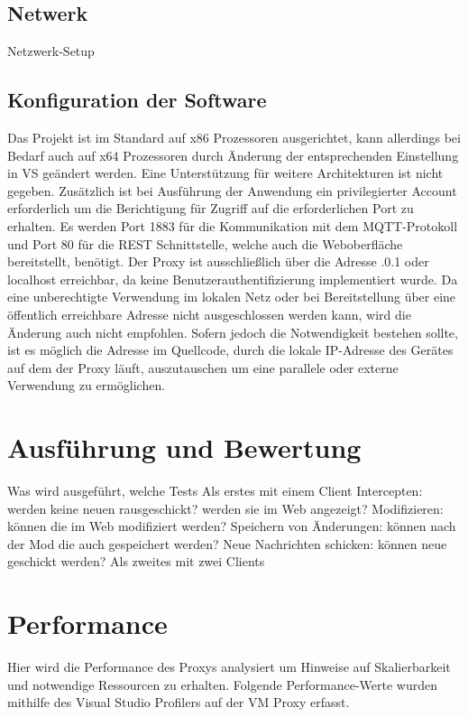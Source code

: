     \subsection{Netwerk}
    Netzwerk-Setup
    
    \subsection{Konfiguration der Software}
    Das Projekt ist im Standard auf x86 Prozessoren ausgerichtet, kann allerdings bei Bedarf auch auf x64 Prozessoren durch Änderung der entsprechenden Einstellung in \ac{VS} geändert werden.
    Eine Unterstützung für weitere Architekturen ist nicht gegeben.
    Zusätzlich ist bei Ausführung der Anwendung ein privilegierter Account erforderlich um die Berichtigung für Zugriff auf die erforderlichen Port zu erhalten.
    Es werden Port 1883 für die Kommunikation mit dem \ac{MQTT}-Protokoll und Port 80 für die \ac{REST} Schnittstelle, welche auch die Weboberfläche bereitstellt, benötigt.
    Der Proxy ist ausschließlich über die Adresse .0.1\grqq{} oder \glqq localhost\grqq{} erreichbar, da keine Benutzerauthentifizierung implementiert wurde. Da eine unberechtigte Verwendung im lokalen Netz oder bei Bereitstellung über eine öffentlich erreichbare Adresse nicht ausgeschlossen werden kann, wird die Änderung auch nicht empfohlen. Sofern jedoch die Notwendigkeit bestehen sollte, ist es möglich die Adresse im Quellcode, durch die lokale IP-Adresse des Gerätes auf dem der Proxy läuft, auszutauschen um eine parallele oder externe Verwendung zu ermöglichen.
    
    
\section{Ausführung und Bewertung}
Was wird ausgeführt, welche Tests
Als erstes mit einem Client
    Intercepten: werden keine neuen rausgeschickt? werden sie im Web angezeigt?
    Modifizieren: können die im Web modifiziert werden?
    Speichern von Änderungen: können nach der Mod die auch gespeichert werden?
    Neue Nachrichten schicken: können neue geschickt werden?
Als zweites mit zwei Clients

\section{Performance}
    Hier wird die Performance des Proxys analysiert um Hinweise auf Skalierbarkeit und notwendige Ressourcen zu erhalten.
    Folgende Performance-Werte wurden mithilfe des Visual Studio Profilers auf der \ac{VM} Proxy erfasst.
    
